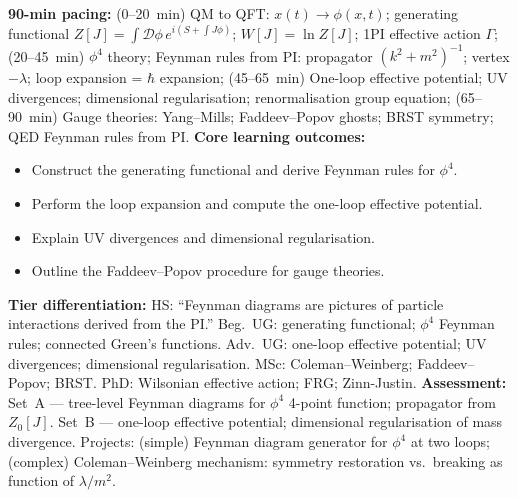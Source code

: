 \documentclass[11pt,a4paper]{article}
\begin{document}
\begin{tcolorbox}[modulebox, title={Module~II.2 / L09: Path Integrals in Field Theory}]
\textbf{90-min pacing:} (0--20~min) QM to QFT: $x(t)\to\phi(x,t)$; generating functional $Z[J]=\int\mathcal{D}\phi\,e^{i(S+\int J\phi)}$; $W[J]=\ln Z[J]$; 1PI effective action $\Gamma$; (20--45~min) $\phi^4$ theory; Feynman rules from PI: propagator $(k^2+m^2)^{-1}$; vertex $-\lambda$; loop expansion = $\hbar$ expansion; (45--65~min) One-loop effective potential; UV divergences; dimensional regularisation; renormalisation group equation; (65--90~min) Gauge theories: Yang--Mills; Faddeev--Popov ghosts; BRST symmetry; QED Feynman rules from PI.
\medskip\textbf{Core learning outcomes:}
\begin{itemize}[leftmargin=1.4em,topsep=2pt,itemsep=1pt]
  \item Construct the generating functional and derive Feynman rules for $\phi^4$.
  \item Perform the loop expansion and compute the one-loop effective potential.
  \item Explain UV divergences and dimensional regularisation.
  \item Outline the Faddeev--Popov procedure for gauge theories.
\end{itemize}
\medskip\textbf{Tier differentiation:}
HS: ``Feynman diagrams are pictures of particle interactions derived from the PI.''
Beg.\ UG: generating functional; $\phi^4$ Feynman rules; connected Green's functions.
Adv.\ UG: one-loop effective potential; UV divergences; dimensional regularisation.
MSc: Coleman--Weinberg; Faddeev--Popov; BRST.
PhD: Wilsonian effective action; FRG; Zinn-Justin.
\medskip\textbf{Assessment:}
Set~A --- tree-level Feynman diagrams for $\phi^4$ 4-point function; propagator from $Z_0[J]$.
Set~B --- one-loop effective potential; dimensional regularisation of mass divergence.
Projects: (simple) Feynman diagram generator for $\phi^4$ at two loops; (complex) Coleman--Weinberg mechanism: symmetry restoration vs.\ breaking as function of $\lambda/m^2$.
\end{tcolorbox}

\medskip
\end{document}
